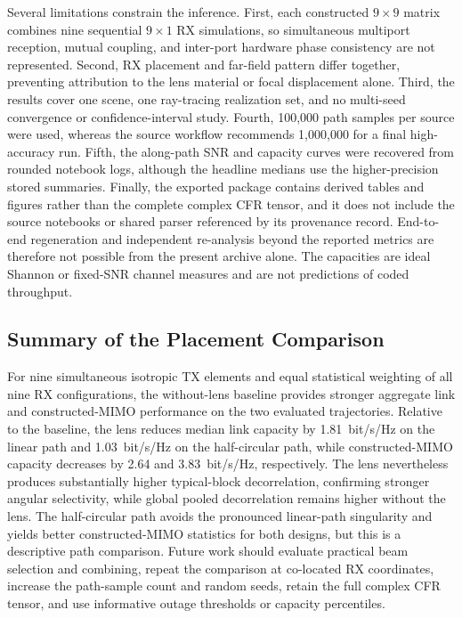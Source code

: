 Several limitations constrain the inference. First, each constructed $9\times9$ matrix combines nine sequential $9\times1$ RX simulations, so simultaneous multiport reception, mutual coupling, and inter-port hardware phase consistency are not represented. Second, RX placement and far-field pattern differ together, preventing attribution to the lens material or focal displacement alone. Third, the results cover one scene, one ray-tracing realization set, and no multi-seed convergence or confidence-interval study. Fourth, 100{,}000 path samples per source were used, whereas the source workflow recommends 1{,}000{,}000 for a final high-accuracy run. Fifth, the along-path SNR and capacity curves were recovered from rounded notebook logs, although the headline medians use the higher-precision stored summaries. Finally, the exported package contains derived tables and figures rather than the complete complex CFR tensor, and it does not include the source notebooks or shared parser referenced by its provenance record. End-to-end regeneration and independent re-analysis beyond the reported metrics are therefore not possible from the present archive alone. The capacities are ideal Shannon or fixed-SNR channel measures and are not predictions of coded throughput.

\subsection{Summary of the Placement Comparison}

For nine simultaneous isotropic TX elements and equal statistical weighting of all nine RX configurations, the without-lens baseline provides stronger aggregate link and constructed-MIMO performance on the two evaluated trajectories. Relative to the baseline, the lens reduces median link capacity by 1.81~bit/s/Hz on the linear path and 1.03~bit/s/Hz on the half-circular path, while constructed-MIMO capacity decreases by 2.64 and 3.83~bit/s/Hz, respectively. The lens nevertheless produces substantially higher typical-block decorrelation, confirming stronger angular selectivity, while global pooled decorrelation remains higher without the lens. The half-circular path avoids the pronounced linear-path singularity and yields better constructed-MIMO statistics for both designs, but this is a descriptive path comparison. Future work should evaluate practical beam selection and combining, repeat the comparison at co-located RX coordinates, increase the path-sample count and random seeds, retain the full complex CFR tensor, and use informative outage thresholds or capacity percentiles.

